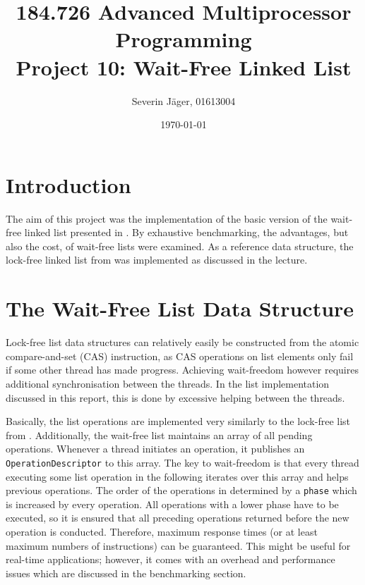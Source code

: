 \documentclass[a4paper, 12pt]{article}
\title{184.726 Advanced Multiprocessor Programming\\
	   Project 10: Wait-Free Linked List}
\author{
  Severin Jäger, 01613004
}
\date{\today}
\begin{document}
\maketitle
\tableofcontents
\pagebreak


\section{Introduction}

The aim of this project was the implementation of the basic version of the wait-free linked list presented in \cite{timnat12}. By exhaustive benchmarking, the advantages, but also the cost, of wait-free lists were examined. As a reference data structure, the lock-free linked list from \cite{harris01} was implemented as discussed in the lecture.

\section{The Wait-Free List Data Structure}

Lock-free list data structures can relatively easily be constructed from the atomic compare-and-set (CAS) instruction, as CAS operations on list elements only fail if some other thread has made progress. Achieving wait-freedom however requires additional synchronisation between the threads. In the list implementation discussed in this report, this is done by excessive helping between the threads.

Basically, the list operations are implemented very similarly to the lock-free list from  \cite{harris01}. Additionally, the wait-free list maintains an array of all pending operations. Whenever a thread initiates an operation, it publishes an \verb|OperationDescriptor| to this array. The key to wait-freedom is that every thread executing some list operation in the following iterates over this array and helps previous operations. The order of the operations in determined by a \verb|phase| which is increased by every operation. All operations with a lower phase have to be executed, so it is ensured that all preceding operations returned before the new operation is conducted. Therefore, maximum response times (or at least maximum numbers of instructions) can be guaranteed. This might be useful for real-time applications; however, it comes with an overhead and performance issues which are discussed in the benchmarking section.
\end{document}
